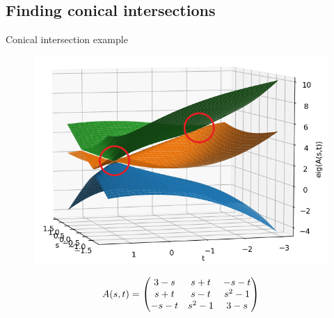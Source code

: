 \documentclass{beamer}
\newcommand\Fontvi{\fontsize{8}{7.2}\selectfont} %
\begin{document}
\subsection{Finding conical intersections}
%
\begin{frame}{Conical intersection example}
    \begin{figure}[h]
        \includegraphics[scale=0.4]{img/slide/conint_3sheet_angle11.png}
        \label{fig:conint}
    \end{figure}
    \Fontvi
    \begin{equation*}
        A(s,t)=
        \begin{pmatrix}
            3-s & s+t & -s-t \cr s+t & s-t & s^2-1 \cr -s-t & s^2-1 & 3-s
        \end{pmatrix}
    \end{equation*}
    
    \nocite{*} %
\end{frame}
\end{document}
